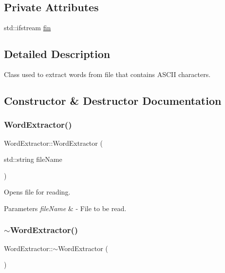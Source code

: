 \subsection*{Private Attributes}
\begin{DoxyCompactItemize}
\item 
std\+::ifstream \mbox{\hyperlink{class_word_extractor_a819fb5e08b5349e0c5f4e97a2393bbb2}{fin}}
\end{DoxyCompactItemize}


\subsection{Detailed Description}
Class used to extract words from file that contains A\+S\+C\+II characters. 

\subsection{Constructor \& Destructor Documentation}
\mbox{\label{class_word_extractor_ab25413856a41ffa0e47682107ba2d456}} 
\subsubsection{\texorpdfstring{Word\+Extractor()}{WordExtractor()}}
{\footnotesize\ttfamily Word\+Extractor\+::\+Word\+Extractor (\begin{DoxyParamCaption}\item[{std\+::string}]{file\+Name }\end{DoxyParamCaption})}

Opens file for reading. 
\begin{DoxyParams}{Parameters}
{\em file\+Name} & -\/ File to be read. \\
\hline
\end{DoxyParams}
\mbox{\label{class_word_extractor_a20476de5cb146afd9bc318a629157a9c}} 
\subsubsection{\texorpdfstring{$\sim$\+Word\+Extractor()}{~WordExtractor()}}
{\footnotesize\ttfamily Word\+Extractor\+::$\sim$\+Word\+Extractor (\begin{DoxyParamCaption}{ }\end{DoxyParamCaption})}

